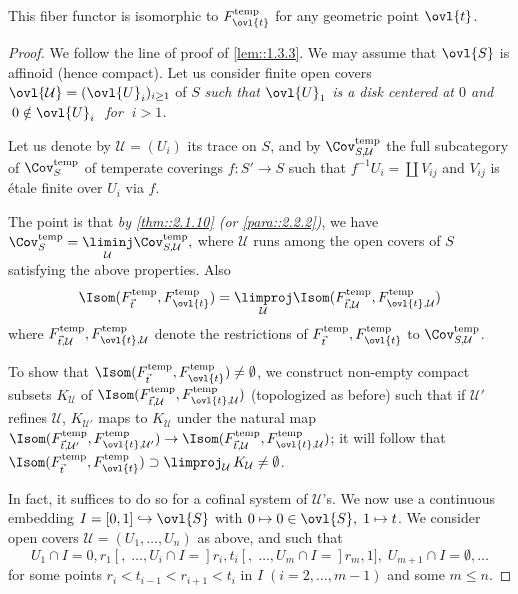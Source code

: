 \begin{pro}\label{pro::2.2.3} This fiber functor is isomorphic to
 $F^{\mathrm{temp}}_{\ovl{t}}$ for any geometric point $\ovl{t}$.
\end{pro}
\begin{proof}
 We follow the line of proof of \ref{lem::1.3.3}. We may assume that
 $\ovl{S}$ is affinoid (hence compact). Let us consider finite open covers
 $\ovl{\mathcal{U}}=(\ovl{U}_i)_{i\geq 1}$ of $S$ {\it such that
 $\ovl{U}_1$ is a disk centered at $0$ and $\;0 \notin \ovl{U}_i\;$ 
 for $\;i>1$.}

 Let us denote by $ \mathcal{U}=(U_i)$ its trace on $S$, and by
 $\Cov^{\mathrm{temp}}_{S,\mathcal{U}}$ the full subcategory of 
 $\Cov^{\mathrm{temp}}_{S}$ of temperate coverings $f:S'\to S$ such that
 $f^{-1}U_i= \coprod V_{ij}$ and $V_{ij}$ is \'etale finite over 
 $U_i$ via $f$. 
 
 The point is that {\it by \ref{thm::2.1.10} (or \ref{para::2.2.2})}, we
 have
 $\displaystyle
 \Cov^{\mathrm{temp}}_{S}=\underset{\mathcal{U}}{\liminj} 
 \Cov^{\mathrm{temp}}_{S,\mathcal{U}}, $ where $\mathcal{U}$ runs among
 the open covers of $S$ satisfying the above properties. Also
 \begin{equation*}
  \Isom(F^{\mathrm{temp}}_{\vec t}, F^{\mathrm{temp}}_{\ovl{t}})
   =\underset{\mathcal{U}}{\limproj} \Isom(F^{\mathrm{temp}}_{\vec
   t,\mathcal{U}}, F^{\mathrm{temp}}_{\ovl{t},\mathcal{U}})
 \end{equation*}
 where $F^{\mathrm{temp}}_{\vec t,\mathcal{U}},
 F^{\mathrm{temp}}_{\ovl{t},\mathcal{U}}$ denote the restrictions of 
 $F^{\mathrm{temp}}_{\vec t }, F^{\mathrm{temp}}_{\ovl{t} }$ to
 $\Cov^{\mathrm{temp}}_{S,\mathcal{U}}$.

 To show that $\Isom(F^{\mathrm{temp}}_{\vec t},
 F^{\mathrm{temp}}_{\ovl{t}}) \neq \emptyset$, we construct 
 non-empty compact subsets $K_\mathcal{U}$ of
 $\Isom(F^{\mathrm{temp}}_{\vec t,\mathcal{U}},
 F^{\mathrm{temp}}_{\ovl{t},\mathcal{U}})$ (topologized 
 as before) such that if $\mathcal{U}'$ refines $\mathcal{U}$,
 $K_{\mathcal{U}'}$ maps to $K_\mathcal{U} $ under the natural map 
 $\Isom(F^{\mathrm{temp}}_{\vec t,\mathcal{U}'},
 F^{\mathrm{temp}}_{\ovl{t},\mathcal{U}'})\to
 \Isom(F^{\mathrm{temp}}_{\vec t,\mathcal{U}},
 F^{\mathrm{temp}}_{\ovl{t},\mathcal{U}})$; it will follow that
 $\Isom(F^{\mathrm{temp}}_{\vec t}, F^{\mathrm{temp}}_{\ovl{t}}) \supset
 \limproj_{\mathcal{U}}\, K_\mathcal{U}\neq 
 \emptyset$. 

 In fact, it suffices to do so for a cofinal system of
 $\mathcal{U}$'s. We now use a continuous embedding 
 $I=[0,1]\hookrightarrow \ovl{S}$ with $0\mapsto 0\in \ovl{S},\;1\mapsto t$. We
 consider open covers $\mathcal{U}  =(U_1,\ldots, U_n)$ as above, and
 such that
 \begin{equation*}
  U_1\cap I = 0,r_1[,\;\ldots, U_i\cap I=]r_i,t_i[,\;\ldots, U_m\cap
   I=]r_m,1],\;U_{m+1}\cap I=\emptyset,\ldots
 \end{equation*}
 for some points $r_i<t_{i-1}<r_{i+1}<t_i$ in $I \;(i=2,\ldots, m-1)$ and
 some $ m\leq n$.
 

\end{proof}
